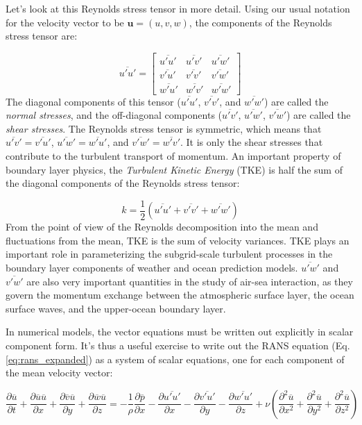\documentclass[12pt]{article}
\numberwithin{equation}{section}
\numberwithin{figure}{section}
\numberwithin{table}{section}
\begin{document}
Let's look at this Reynolds stress tensor in more detail.
Using our usual notation for the velocity vector to be $\mathbf{u} = (u, v, w)$,
the components of the Reynolds stress tensor are:

\begin{equation}
  \overline{u'u'} = \begin{bmatrix}
    \overline{u'u'} & \overline{u'v'} & \overline{u'w'} \\
    \overline{v'u'} & \overline{v'v'} & \overline{v'w'} \\
    \overline{w'u'} & \overline{w'v'} & \overline{w'w'}
  \end{bmatrix}
\end{equation}
The diagonal components of this tensor ($\overline{u'u'}$, $\overline{v'v'}$, and
$\overline{w'w'}$) are called the \textit{normal stresses}, and the off-diagonal
components ($\overline{u'v'}$, $\overline{u'w'}$, $\overline{v'w'}$) are called
the \textit{shear stresses}.
The Reynolds stress tensor is symmetric, which means that
$\overline{u'v'} = \overline{v'u'}$, $\overline{u'w'} = \overline{w'u'}$, and
$\overline{v'w'} = \overline{w'v'}$.
It is only the shear stresses that contribute to the turbulent transport of
momentum.
An important property of boundary layer physics, the
\textit{Turbulent Kinetic Energy} (TKE) is half
the sum of the diagonal components of the Reynolds stress tensor:

\begin{equation}
  k = \frac{1}{2} \left( \overline{u'u'} + \overline{v'v'} + \overline{w'w'} \right)
\end{equation}
From the point of view of the Reynolds decomposition into the mean and
fluctuations from the mean, TKE is the sum of velocity variances.
TKE plays an important role in parameterizing the subgrid-scale turbulent
processes in the boundary layer components of weather and ocean prediction
models.
$\overline{u'w'}$ and $\overline{v'w'}$ are also very important quantities in
the study of air-sea interaction, as they govern the momentum exchange between
the atmospheric surface layer, the ocean surface waves, and the upper-ocean
boundary layer.

In numerical models, the vector equations must be written out explicitly in
scalar component form.
It's thus a useful exercise to write out the RANS equation
(Eq. \ref{eq:rans_expanded}) as a system of scalar equations, one for each
component of the mean velocity vector:

\begin{equation}
  \frac{\partial \overline{u}}{\partial t} + 
  \frac{\partial \overline{u} \overline{u}}{\partial x} +
  \frac{\partial \overline{v} \overline{u}}{\partial y} +
  \frac{\partial \overline{w} \overline{u}}{\partial z} =
  - \frac{1}{\rho} \frac{\partial \overline{p}}{\partial x}
  - \frac{\partial \overline{u'u'}}{\partial x} - \frac{\partial \overline{v'u'}}{\partial y} - \frac{\partial \overline{w'u'}}{\partial z}
  + \nu \left( \frac{\partial^2 \overline{u}}{\partial x^2} + 
               \frac{\partial^2 \overline{u}}{\partial y^2} +
               \frac{\partial^2 \overline{u}}{\partial z^2}
        \right)
\end{equation}
\end{document}
